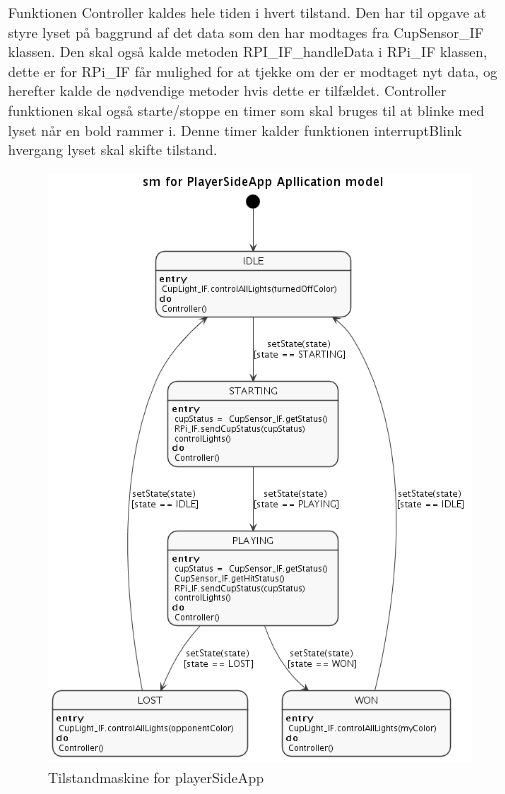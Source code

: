 \documentclass[Arkitektur/System_main.tex]{subfiles}
\begin{document}
Funktionen Controller kaldes hele tiden i hvert tilstand. Den har til opgave at styre lyset på baggrund af det data som den har modtages fra CupSensor\_IF klassen. Den skal også kalde metoden RPI\_IF\_handleData i RPi\_IF klassen, dette er for RPi\_IF får mulighed for at tjekke om der er modtaget nyt data, og herefter kalde de nødvendige metoder hvis dette er tilfældet. Controller funktionen skal også starte/stoppe en timer som skal bruges til at blinke med lyset når en bold rammer i. Denne timer kalder funktionen interruptBlink hvergang lyset skal skifte tilstand. 

\begin{figure}[H]
    \centering
    \includegraphics[width=\textwidth]{Arkitektur/Softwarearkitektur/Applikationsmodel/PlayerSide/graphics/state.png}
    \caption{Tilstandmaskine for playerSideApp}
    \label{fig:playerSide_SM}
\end{figure}
\end{document}
